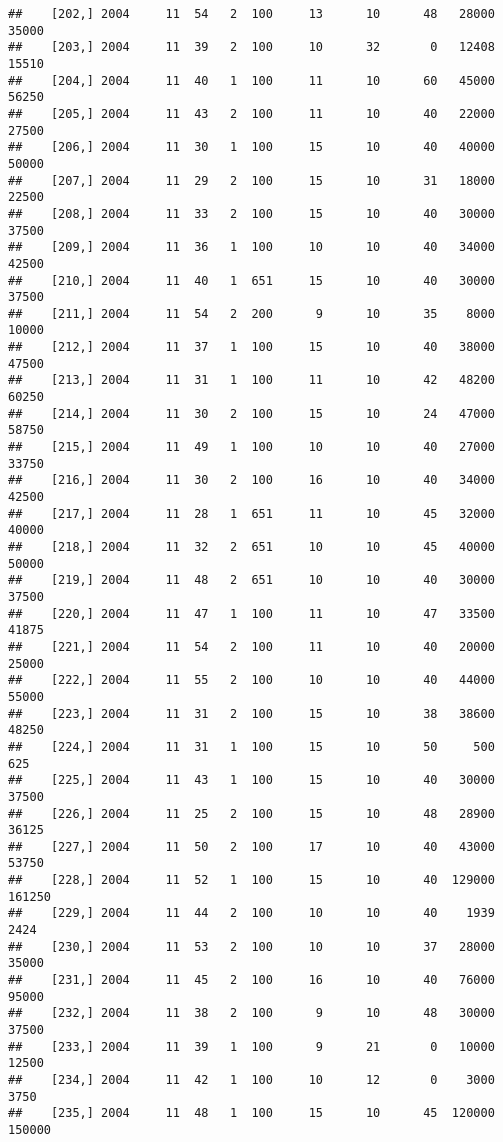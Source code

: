 \documentclass{article}\usepackage[]{graphicx}\usepackage[]{color}
\makeatletter
\newenvironment{kframe}{%
 \def\at@end@of@kframe{}%
 \ifinner\ifhmode%
  \def\at@end@of@kframe{\end{minipage}}%
  \begin{minipage}{\columnwidth}%
 \fi\fi%
 \def\FrameCommand##1{\hskip\@totalleftmargin \hskip-\fboxsep
 \colorbox{shadecolor}{##1}\hskip-\fboxsep
     \hskip-\linewidth \hskip-\@totalleftmargin \hskip\columnwidth}%
 \MakeFramed {\advance\hsize-\width
   \@totalleftmargin\z@ \linewidth\hsize
   \@setminipage}}%
 {\par\unskip\endMakeFramed%
 \at@end@of@kframe}
\newenvironment{knitrout}{}{} %
\makeatother
\begin{document}
\begin{knitrout}
\begin{kframe}
\begin{verbatim}
##    [202,] 2004     11  54   2  100     13      10      48   28000   35000
##    [203,] 2004     11  39   2  100     10      32       0   12408   15510
##    [204,] 2004     11  40   1  100     11      10      60   45000   56250
##    [205,] 2004     11  43   2  100     11      10      40   22000   27500
##    [206,] 2004     11  30   1  100     15      10      40   40000   50000
##    [207,] 2004     11  29   2  100     15      10      31   18000   22500
##    [208,] 2004     11  33   2  100     15      10      40   30000   37500
##    [209,] 2004     11  36   1  100     10      10      40   34000   42500
##    [210,] 2004     11  40   1  651     15      10      40   30000   37500
##    [211,] 2004     11  54   2  200      9      10      35    8000   10000
##    [212,] 2004     11  37   1  100     15      10      40   38000   47500
##    [213,] 2004     11  31   1  100     11      10      42   48200   60250
##    [214,] 2004     11  30   2  100     15      10      24   47000   58750
##    [215,] 2004     11  49   1  100     10      10      40   27000   33750
##    [216,] 2004     11  30   2  100     16      10      40   34000   42500
##    [217,] 2004     11  28   1  651     11      10      45   32000   40000
##    [218,] 2004     11  32   2  651     10      10      45   40000   50000
##    [219,] 2004     11  48   2  651     10      10      40   30000   37500
##    [220,] 2004     11  47   1  100     11      10      47   33500   41875
##    [221,] 2004     11  54   2  100     11      10      40   20000   25000
##    [222,] 2004     11  55   2  100     10      10      40   44000   55000
##    [223,] 2004     11  31   2  100     15      10      38   38600   48250
##    [224,] 2004     11  31   1  100     15      10      50     500     625
##    [225,] 2004     11  43   1  100     15      10      40   30000   37500
##    [226,] 2004     11  25   2  100     15      10      48   28900   36125
##    [227,] 2004     11  50   2  100     17      10      40   43000   53750
##    [228,] 2004     11  52   1  100     15      10      40  129000  161250
##    [229,] 2004     11  44   2  100     10      10      40    1939    2424
##    [230,] 2004     11  53   2  100     10      10      37   28000   35000
##    [231,] 2004     11  45   2  100     16      10      40   76000   95000
##    [232,] 2004     11  38   2  100      9      10      48   30000   37500
##    [233,] 2004     11  39   1  100      9      21       0   10000   12500
##    [234,] 2004     11  42   1  100     10      12       0    3000    3750
##    [235,] 2004     11  48   1  100     15      10      45  120000  150000

\end{verbatim}
\end{kframe}
\end{knitrout}
\end{document}
